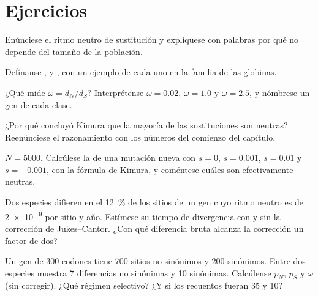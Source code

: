 \section{Ejercicios}

\begin{exercise}[$\star$]\label{exo:b3:molecular-evolution:1}
Enúnciese el ritmo neutro de sustitución y explíquese con palabras por
qué no depende del tamaño de la población.
\end{exercise}

\begin{exercise}[$\star$]\label{exo:b3:molecular-evolution:2}
Defínanse ,  y , con un ejemplo de cada uno en
la familia de las globinas.
\end{exercise}

\begin{exercise}[$\star$]\label{exo:b3:molecular-evolution:3}
¿Qué mide $\omega = d_{N}/d_{S}$? Interprétense $\omega = 0.02$,
$\omega = 1.0$ y $\omega = 2.5$, y nómbrese un gen de cada clase.
\end{exercise}

\begin{exercise}[$\star$]\label{exo:b3:molecular-evolution:4}
¿Por qué concluyó Kimura que la mayoría de las sustituciones son
neutras? Reenúnciese el razonamiento con los números del comienzo del
capítulo.
\end{exercise}

\begin{exercise}[$\star\star$]\label{exo:b3:molecular-evolution:5}
$N = 5000$. Calcúlese la  de una mutación nueva
con $s
= 0$, $s = 0.001$, $s = 0.01$ y $s = -0.001$, con la fórmula de Kimura, y
coméntese cuáles son efectivamente neutras.
\end{exercise}

\begin{exercise}[$\star\star$]\label{exo:b3:molecular-evolution:6}
Dos especies difieren en el \qty{12}{\%} de los sitios de un gen cuyo
ritmo neutro es de \qty{2e-9}{} por sitio y año. Estímese su tiempo de
divergencia con y sin la corrección de Jukes--Cantor. ¿Con qué
diferencia bruta alcanza la corrección un factor de dos?
\end{exercise}

\begin{exercise}[$\star\star$]\label{exo:b3:molecular-evolution:7}
Un gen de 300 codones tiene 700 sitios no sinónimos y 200 sinónimos.
Entre dos especies muestra 7 diferencias no sinónimas y 10 sinónimas.
Calcúlense $p_{N}$, $p_{S}$ y $\omega$ (sin corregir). ¿Qué régimen
selectivo? ¿Y si los recuentos fueran 35 y 10?
\end{exercise}

